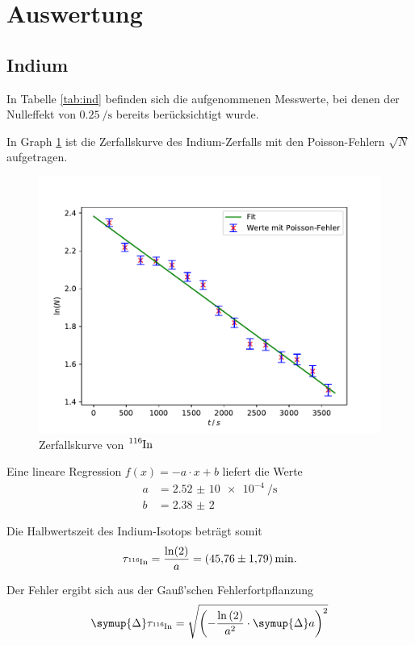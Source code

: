 \section{Auswertung}

\subsection{Indium \label{sec:ind}}
In Tabelle \ref{tab:ind} befinden sich die aufgenommenen Messwerte, bei denen der Nulleffekt von $\SI{0,25}{\per \s}$ bereits berücksichtigt wurde.

In Graph \ref{fig:ind} ist die Zerfallskurve des Indium-Zerfalls mit den Poisson-Fehlern $\sqrt{N}$ aufgetragen.
\begin{figure}[H]
  \centering
  \includegraphics[width=\textwidth]{Plots/ind.pdf}
  \caption{Zerfallskurve von $\ce{^{116}In}$}
  \label{fig:ind}
\end{figure}

Eine lineare Regression $f(x) = -a \cdot x + b$ liefert die Werte
\begin{align*}
  a &= \SI{2,52(10)e-4}{\per \s} \\
  b &= \SI{2,38(2)}{}
\end{align*}

Die Halbwertszeit des Indium-Isotops beträgt somit
\begin{equation*}
  \tau_{\ce{^{116}In}} = \frac{\ln(2)}{a} = \SI{45,76(179)}{\min}.
\end{equation*}

Der Fehler ergibt sich aus der Gauß'schen Fehlerfortpflanzung
\begin{equation}
  \symup{\Delta} \tau_{\ce{^{116}In}} = \sqrt{\left(-\frac{\ln{(2)}}{a^2} \cdot \symup{\Delta}a \right)^2}
\end{equation}

